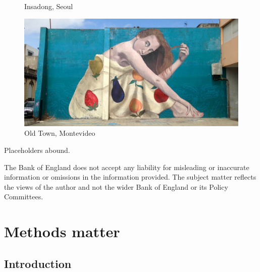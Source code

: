 \documentclass[
  letterpaper,
]{book}
\begin{document}
\begin{figure}
\begin{minipage}[t]{0.50\linewidth}
{{}

\caption{Insadong, Seoul}

}

\end{minipage}%

\end{figure}

\begin{figure}

{\centering \includegraphics{Montevideo.jpg}

}

\caption{Old Town, Montevideo}

\end{figure}

Placeholders abound.

\begin{tcolorbox}[enhanced jigsaw, colbacktitle=quarto-callout-note-color!10!white, coltitle=black, toptitle=1mm, breakable, colframe=quarto-callout-note-color-frame, colback=white, arc=.35mm, bottomtitle=1mm, opacityback=0, leftrule=.75mm, toprule=.15mm, title=\textcolor{quarto-callout-note-color}{\faInfo}\hspace{0.5em}{Disclaimer}, opacitybacktitle=0.6, titlerule=0mm, rightrule=.15mm, bottomrule=.15mm, left=2mm]

The Bank of England does not accept any liability for misleading or
inaccurate information or omissions in the information provided. The
subject matter reflects the views of the author and not the wider Bank
of England or its Policy Committees.

\end{tcolorbox}

\part{Methods matter}

\hypertarget{introduction}{%
\chapter{Introduction}\label{introduction}}
\end{document}
